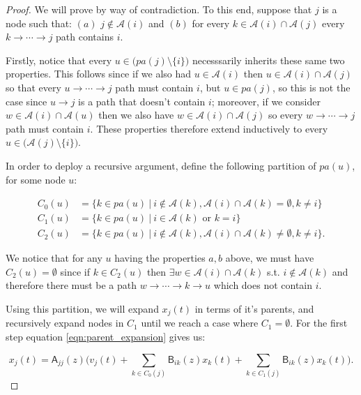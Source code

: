 \documentclass[12pt]{article}
\def\B{\mathsf{B}}  %
\def\A{\mathsf{A}}  %
\newcommand{\pa}[1]{pa(#1)}  %
\newcommand{\anc}[1]{\mathcal{A}(#1)}  %
\newcommand{\gcgpath}[2]{#1 \rightarrow \cdots \rightarrow #2}  %
\begin{document}
\begin{proof}
  We will prove by way of contradiction.  To this end, suppose that
  $j$ is a node such that: $(a)$ $j \not \in \anc{i}$ and $(b)$ for
  every $k \in \anc{i} \cap \anc{j}$ every
  $k \rightarrow \cdots \rightarrow j$ path contains $i$.

  Firstly, notice that every $u \in \big(\pa{j} \setminus \{i\}\big)$
  necesssarily inherits these same two properties.  This follows since
  if we also had $u \in \anc{i}$ then $u \in \anc{i} \cap \anc{j}$ so that every
  $u \rightarrow \cdots \rightarrow j$ path must contain $i$, but
  $u \in \pa{j}$, so this is not the case since $u \rightarrow j$ is a
  path that doesn't contain $i$; moreover, if we consider
  $w \in \anc{i} \cap \anc{u}$ then we also have
  $w \in \anc{i} \cap \anc{j}$ so every
  $w \rightarrow \cdots \rightarrow j$ path must contain $i$.  These
  properties therefore extend inductively to every
  $u \in \big(\anc{j} \setminus \{i\}\big)$.

  In order to deploy a recursive argument, define the following
  partition of $\pa{u}$, for some node $u$:

  \begin{align*}
    C_0(u) &= \{k \in \pa{u}\ |\ i \not\in \anc{k}, \anc{i} \cap \anc{k} = \emptyset, k \ne i\}\\
    C_1(u) &= \{k \in \pa{u}\ |\ i \in \anc{k} \text{ or } k = i\}\\
    C_2(u) &= \{k \in \pa{u}\ |\ i \not\in \anc{k}, \anc{i} \cap \anc{k} \ne \emptyset, k \ne i\}.
  \end{align*}

  We notice that for any $u$ having the properties $a, b$ above, we
  must have $C_2(u) = \emptyset$ since if $k \in C_2(u)$ then
  $\exists w \in \anc{i} \cap \anc{k}$ s.t. $i \not \in \anc{k}$ and
  therefore there must be a path $\gcgpath{w}{k} \rightarrow u$ which
  does not contain $i$.

  Using this partition, we will expand $x_j(t)$ in terms of it's
  parents, and recursively expand nodes in $C_1$ until we reach a case
  where $C_1 = \emptyset$.  For the first step equation
  \eqref{eqn:parent_expansion} gives us:

  \begin{equation}
    \label{eqn:xj_partition_expansion}
    x_j(t) = \A_{jj}(z)\Big(v_j(t) + \sum_{k \in C_0(j)}\B_{ik}(z)x_k(t) + \sum_{k \in C_1(j)}\B_{ik}(z)x_k(t)\Big).
  \end{equation}


\end{proof}
\end{document}
